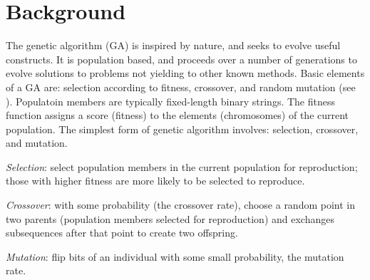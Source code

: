 \section{Background}
The genetic algorithm (GA) is inspired by nature, and seeks to evolve useful constructs. It is population based, and 
proceeds over a number of generations to evolve solutions to problems not yielding to other known methods. 
Basic elements of a GA are: 
selection according to fitness, crossover, and random mutation (see \cite{Mitchell1999}). 
Populatoin members are typically fixed-length binary strings.   
The fitness function assigns a score (fitness) to the elements (chromosomes) of 
the current population. The simplest form of genetic algorithm involves: selection, crossover, and mutation.

\textit{Selection}: select population members in the current population for reproduction; 
those with higher fitness are more likely to be selected to reproduce.

\textit{Crossover}: with some probability (the crossover rate), choose a random point in two parents (population members selected for reproduction) 
and exchanges subsequences after that point to create two offspring.

\textit{Mutation}: flip bits of an individual with some small probability, 
the mutation rate.

